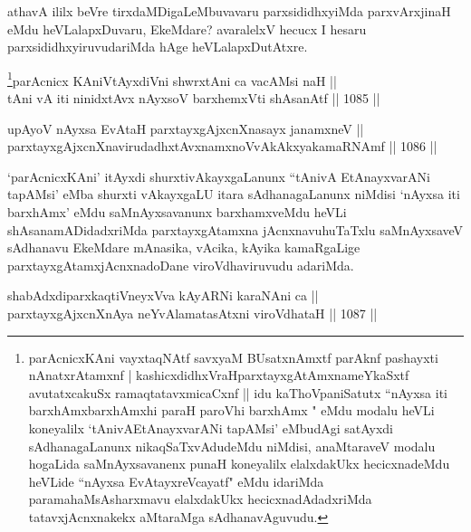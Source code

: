 \begin{artha}
athavA ililx beVre tirxdaMDigaLeMbuvavaru parxsididhxyiMda parxvArxjinaH eMdu heVLalapxDuvaru, EkeMdare? avaralelxV hecucx I hesaru parxsididhxyiruvudariMda hAge heVLalapxDutAtxre.
\end{artha}



\begin{shl}
\footnote{parAcnicxKAni vayxtaqNAtf savxyaM BUsatxnAmxtf parAknf pashayxti nAnatxrAtamxnf | kashicxdidhxVraH\break parxtayxgAtAmxnameYkaSxtf avutatxcakuSx ramaqtatavxmicaCxnf ||  idu kaThoVpaniSatutx ``nAyxsa iti barxhAmx\break barxhAmxhi paraH paroVhi barxhAmx " eMdu modalu heVLi koneyalilx `tAnivAEtAnayxvarANi tapAMsi' eMbudAgi satAyxdi sAdhanagaLanunx nikaqSaTxvAdudeMdu niMdisi, anaMtaraveV modalu hogaLida saMnAyxsavanenx punaH koneyalilx elalxdakUkx hecicxnadeMdu heVLide ``nAyxsa EvAtayxreVcayatf" eMdu idariMda paramahaMsAsharxmavu elalxdakUkx hecicxnadAdadxriMda tatavxjAcnxnakekx aMtaraMga sAdhanavAguvudu.}parAcnicx KAniVtAyxdiVni shwrxtAni ca vacAMsi naH || \\
tAni vA iti ninidxtAvx nAyxsoV barxhemxVti shAsanAtf \hfill || 1085 ||  
\end{shl}
				
\begin{shl}
upAyoV nAyxsa EvAtaH parxtayxgAjxcnXnasayx janamxneV || \\
parxtayxgAjxcnXnavirudadhxtAvxnamxnoVvAkAkxyakamaRNAmf \hfill || 1086 ||  
\end{shl}

\begin{artha}
`parAcnicxKAni' itAyxdi shurxtivAkayxgaLanunx ``tAnivA EtAnayxvarANi tapAMsi' eMba shurxti vAkayxgaLU itara sAdhanagaLanunx niMdisi `nAyxsa iti barxhAmx' eMdu saMnAyxsavanunx barxhamxveMdu heVLi shAsanamADidadxriMda parxtayxgAtamxna jAcnxnavuhuTaTxlu saMnAyxsaveV sAdhanavu EkeMdare mAnasika, vAcika, kAyika kamaRgaLige parxtayxgAtamxjAcnxnadoDane viroVdhaviruvudu adariMda.
\end{artha}


\begin{shl}
shabAdxdiparxkaqtiVneyxVva kAyARNi karaNAni ca || \\
parxtayxgAjxcnXnAya neYvAlamatasAtxni viroVdhataH \hfill || 1087 ||  
\end{shl}	

